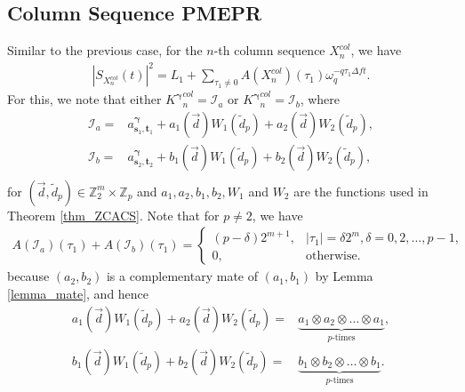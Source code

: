 \documentclass[pdflatex,sn-mathphys-num]{sn-jnl}%
\theoremstyle{thmstyleone}
\begin{document}
	\subsection{Column Sequence PMEPR}
	Similar to the previous case, for the $n$-th column sequence $X_n^{col}$, we have
	\begin{equation}
		\begin{split}
			\left|S_{X_n^{col}} (t) \right|^2 = L_1 + \sum_{\tau_1 \neq 0}^{} A(X_n^{col}) (\tau_1) \omega_q^{- q \tau_1 \Delta f t}.
		\end{split}
	\end{equation}
	For this, we note that either ${K^{\bm{\gamma}}}^{col}_n= \mathcal{I}_a$ or ${K^{\bm{\gamma}}}^{col}_n= \mathcal{I}_b$, where 
	\begin{equation}
		\begin{split}
			\mathcal{I}_a = &a_{\mathbf{s}_1, \mathbf{t}_1}^{\bm{\gamma}} + a_1(\vec{d}) W_1(\tilde{d}_p) + a_2(\vec{d}) W_2(\tilde{d}_p),\\ \mathcal{I}_b = & a_{\mathbf{s}_2, \mathbf{t}_2}^{\bm{\gamma}} + b_1(\vec{d}) W_1(\tilde{d}_p) + b_2(\vec{d}) W_2(\tilde{d}_p),\\
		\end{split}
	\end{equation}
	for $(\vec{d}, \tilde{d}_p) \in \mathbb{Z}_2^m \times \mathbb{Z}_p$ and $a_1, a_2, b_1, b_2, W_1$ and $W_2$ are the functions used in Theorem \ref{thm_ZCACS}. Note that for $p \neq2$, we have
	\begin{equation}
		\begin{split}
			A( \mathcal{I}_a)(\tau_1) + A( \mathcal{I}_b)(\tau_1)=
			\begin{cases}
				(p-\delta) 2^{m+1},  & \left| \tau_1 \right| = \delta 2^m, \delta = 0,2, \dots, p-1,\\
				0, & \text{otherwise}.
			\end{cases}
		\end{split}
	\end{equation}
	because $(a_2, b_2)$ is a complementary mate of $(a_1, b_1)$ by Lemma \ref{lemma_mate}, and hence
	\begin{equation}
		\begin{split}
			a_1(\vec{d}) W_1(\tilde{d}_p) + a_2(\vec{d}) W_2(\tilde{d}_p)=& \underbrace{ a_1\otimes a_2\otimes\dots\otimes a_1 }_{p\text{-times}},\\
			b_1(\vec{d}) W_1(\tilde{d}_p)+ b_2(\vec{d}) W_2(\tilde{d}_p)= &\underbrace{ b_1\otimes b_2 \otimes \dots \otimes b_1 }_{p\text{-times}}.
		\end{split}
	\end{equation}
\end{document}
